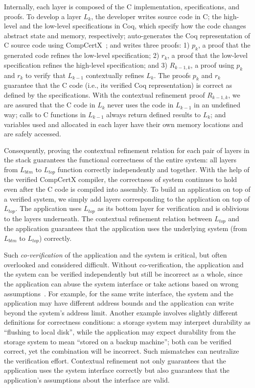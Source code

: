 Internally, each layer is composed of the C implementation, specifications, and proofs.
To develop a layer $L_k$, the developer writes source code in C; the high-level and the low-level specifications in Coq, which specify how the code changes abstract state and memory, respectively; auto-generates the Coq representation of C source code using CompCertX~\cite{deepspec}; and writes three proofs: 1) $p_k$, a proof that the generated code refines the low-level specification; 2) $r_k$, a proof that the low-level specification refines the high-level specification; and 3) $R_{k-1,k}$, a proof using $p_k$ and $r_k$ to verify that $L_{k-1}$ contextually refines $L_{k}$. The proofs $p_k$ and $r_k$ guarantee that the C code (i.e., its verified Coq representation) is correct as defined by the specifications. With the contextual refinement proof $R_{k-1, k}$, we are assured that the C code in $L_k$ never uses the code in $L_{k-1}$ in an undefined way; calls to C functions in $L_{k-1}$ always return defined results to $L_k$; and variables used and allocated in each layer have their own memory locations and are safely accessed.


Consequently, proving the contextual refinement relation for each pair of layers in the stack guarantees the functional correctness of the entire system: all layers from $L_{btm}$ to $L_{top}$ function correctly independently and together. With the help of the verified CompCertX compiler, the correctness of system continues to hold even after the C code is compiled into assembly. 
To build an application on top of a verified system, we simply add layers corresponding to the application on top of $L_{top}$. The application uses $L_{top}$ as its bottom layer for verification and is oblivious to the layers underneath. The contextual refinement relation between $L_{top}$ and the application guarantees that the application uses the underlying system (from $L_{btm}$ to $L_{top}$) correctly. 


Such \textit{co-verification} of the application and the system is critical, but often overlooked and considered difficult.
Without co-verification, the application and the system can be verified independently but still be incorrect as a whole, since the application can abuse the system interface or take actions based on wrong assumptions~\cite{shimlayer}. For example, for the same write interface, the system and the application may have different address bounds and the application can write beyond the system's address limit. Another example involves slightly different definitions for correctness conditions: a storage system may interpret durability as ``flushing to local disk'', while the application may expect durability from the storage system to mean ``stored on a backup machine''; both can be verified correct, yet the combination will be incorrect. Such mismatches can neutralize the verification effort. Contextual refinement not only guarantees that the application uses the system interface correctly but also guarantees that the application's assumptions about the interface are valid. 
